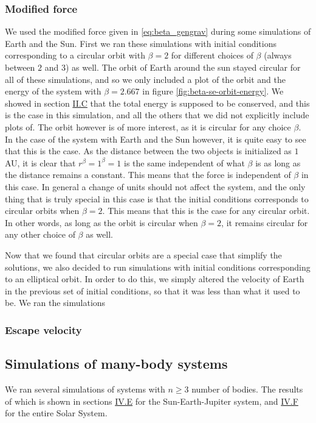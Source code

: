 \documentclass[reprint,english,notitlepage]{revtex4-1}  %
\begin{document}
\subsubsection{Modified force} \label{sec:V:b:ii}

We used the modified force given in \eqref{eq:beta_gengrav} during some simulations of Earth and the Sun. First we ran these simulations with initial conditions corresponding to a circular orbit with $\beta = 2$ for different choices of $\beta$ (always between $2$ and $3$) as well. The orbit of Earth around the sun stayed circular for all of these simulations, and so we only included a plot of the orbit and the energy of the system with $\beta = 2.667$ in figure \ref{fig:beta-se-orbit-energy}. We showed in section \hyperref[sec:II:c]{II.C} that the total energy is supposed to be conserved, and this is the case in this simulation, and all the others that we did not explicitly include plots of. The orbit however is of more interest, as it is circular for any choice $\beta$. In the case of the system with Earth and the Sun however, it is quite easy to see that this is the case. As the distance between the two objects is initialized as $1$ AU, it is clear that $r^\beta = 1^\beta = 1$ is the same independent of what $\beta$ is as long as the distance remains a constant. This means that the force is independent of $\beta$ in this case. In general a change of units should not affect the system, and the only thing that is truly special in this case is that the initial conditions corresponds to circular orbits when $\beta = 2$. This means that this is the case for any circular orbit. In other words, as long as the orbit is circular when $\beta = 2$, it remains circular for any other choice of $\beta$ as well.

Now that we found that circular orbits are a special case that simplify the solutions, we also decided to run simulations with initial conditions corresponding to an elliptical orbit. In order to do this, we simply altered the velocity of Earth in the previous set of initial conditions, so that it was less than what it used to be. We ran the simulations


\subsubsection{Escape velocity} \label{sec:V:b:iv}


\subsection{Simulations of many-body systems} \label{sec:V:c}
We ran several simulations of systems with \(n\geq3\) number of bodies. The results of which is shown in sections \hyperref[sec:IV:e]{IV.E} for the Sun-Earth-Jupiter system, and \hyperref[sec:IV:f]{IV.F} for the entire Solar System.
\end{document}
